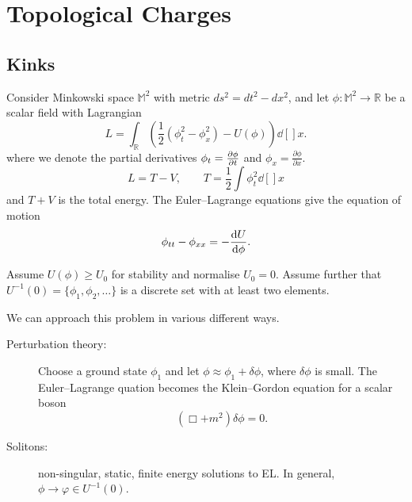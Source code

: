 
\chapter{Topological Charges}%
\label{cha:topological_charges}

\section{Kinks}%
\label{sec:kinks}

Consider Minkowski space $\mathbb{M}^2$ with metric $ds^2 = dt^2 - dx^2$, and let $\phi \colon \mathbb{M}^2 \to \mathbb{R}$ be a scalar field with Lagrangian
\begin{equation}
  L = \int_\mathbb{R} \left( \frac{1}{2} (\phi_t^2 - \phi_x^2) - U(\phi) \right) \dd[]{x}.
\end{equation}
where we denote the partial derivatives $\phi_t = \pdv{\phi}{t}$ and $\phi_x = \frac{\partial \phi}{\partial x}$.
\begin{equation}
  L = T - V, \qquad T = \frac{1}{2} \int \phi_t^2 \dd[]{x}
\end{equation}
and $T + V$ is the total energy.
The Euler--Lagrange equations give the equation of motion
\begin{equation}
  \phi_{tt} - \phi_{xx} = -\dv{U}{\phi}.
\end{equation}

Assume $U(\phi) \geq U_0$ for stability and normalise $U_0 = 0$.
Assume further that $U^{-1}(0) = \{\phi_1, \phi_2, \dots\}$ is a discrete set with at least two elements.
\begin{figure}[ht]
    \centering
    \caption{}
    \label{fig:l10f1}
\end{figure}
We can approach this problem in various different ways.
\begin{description}
  \item[Perturbation theory:] Choose a ground state $\phi_1$ and let $\phi \approx \phi_1 + \delta \phi$, where $\delta \phi$ is small. The Euler--Lagrange quation becomes the Klein--Gordon equation for a scalar boson
    \begin{equation}
      (\Box + m^2) \delta \phi = 0.
    \end{equation}
  \item[Solitons:] non-singular, static, finite energy solutions to EL.
    In general, $\phi \to \varphi \in U^{-1}(0)$.
\end{description}

